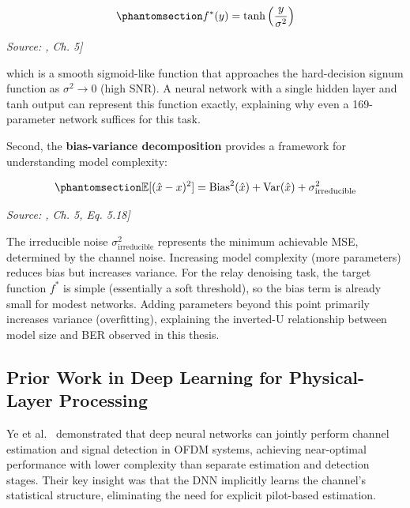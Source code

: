 \begin{equation}\protect\phantomsection\label{eq:optimal-denoiser-awgn}{f^*(y) = \tanh\left(\frac{y}{\sigma^2}\right)
}\end{equation} \par{\small\textit{Source: \cite{GoodfellowBengioCourville2016DeepLearning}, Ch. 5]}}

which is a smooth sigmoid-like function that approaches the hard-decision signum function as \(\sigma^2 \to 0\) (high SNR). A neural network with a single hidden layer and tanh output can represent this function exactly, explaining why even a 169-parameter network suffices for this task.

Second, the \textbf{bias-variance decomposition} provides a framework for understanding model complexity:

\begin{equation}\protect\phantomsection\label{eq:bias-variance-decomp}{\mathbb{E}[(\hat{x} - x)^2] = \text{Bias}^2(\hat{x}) + \text{Var}(\hat{x}) + \sigma^2_{\text{irreducible}}
}\end{equation} \par{\small\textit{Source: \cite{GoodfellowBengioCourville2016DeepLearning}, Ch. 5, Eq. 5.18]}}

The irreducible noise \(\sigma^2_{\text{irreducible}}\) represents the minimum achievable MSE, determined by the channel noise. Increasing model complexity (more parameters) reduces bias but increases variance. For the relay denoising task, the target function \(f^*\) is simple (essentially a soft threshold), so the bias term is already small for modest networks. Adding parameters beyond this point primarily increases variance (overfitting), explaining the inverted-U relationship between model size and BER observed in this thesis.

\subsection{Prior Work in Deep Learning for Physical-Layer Processing}\label{sec:prior-work-in-deep-learning-for-physical-layer-processing}

Ye et al.~\cite{YeLiJuang2018OFDMDL} demonstrated that deep neural networks can jointly perform channel estimation and signal detection in OFDM systems, achieving near-optimal performance with lower complexity than separate estimation and detection stages. Their key insight was that the DNN implicitly learns the channel's statistical structure, eliminating the need for explicit pilot-based estimation.

